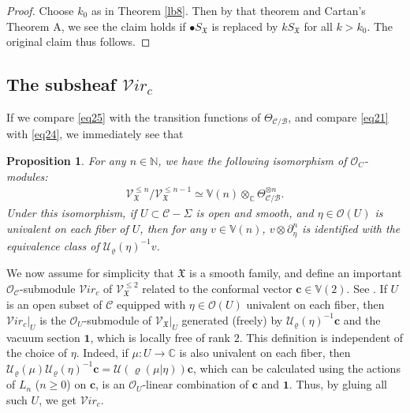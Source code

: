 \documentclass[12pt,a4paper,notitlepage]{article}
\theoremstyle{definition}
\theoremstyle{plain}
\newtheorem{pp}[df]{Proposition}
\newcommand{\fk}{\mathfrak}
\newcommand{\mc}{\mathcal}
\newcommand{\id}{\mathbf{1}}
\newcommand{\scr}{\mathscr}
\newcommand{\SX}{S_{\fk X}}
\newcommand{\blt}{\bullet}
\newcommand{\Vbb}{\mathbb V}
\newcommand{\Cbb}{\mathbb C}
\newcommand{\Nbb}{\mathbb N}
\newcommand{\cbf}{\mathbf c}
\newcommand{\svir}{\mathcal V\!\mathit{ir}}
\numberwithin{equation}{section}
\begin{document}
\begin{proof}
Choose $k_0$ as in Theorem \ref{lb8}. Then by that theorem  and Cartan's Theorem A, we see the claim holds if $\blt\SX$ is replaced by $k\SX$ for all $k>k_0$. The original claim thus follows.
\end{proof}







\subsection*{The subsheaf $\svir_c$}

If we compare \eqref{eq25} with the transition functions of $\Theta_{\mc C/\mc B}$, and  compare \eqref{eq21} with \eqref{eq24}, we immediately see that

\begin{pp}\label{lb12}
For any $n\in\Nbb$, we have the following isomorphism of  $\scr O_C$-modules:
	\begin{align}
	\scr V_{\fk X}^{\leq n}/\scr V_{\fk X}^{\leq n-1}\simeq\Vbb(n)\otimes_{\Cbb}\Theta_{\mc C/\mc B}^{\otimes n}.
	\end{align}
Under this isomorphism, if $U\subset \mc C-\Sigma$ is open and smooth, and $\eta\in\scr O(U)$ is univalent on each fiber of $U$, then for any $v\in\Vbb(n)$, $v\otimes \partial_\eta^n$ is identified with the equivalence class of $\mc U_\varrho(\eta)^{-1}v$.
\end{pp}

We now assume for simplicity that $\fk X$ is a smooth family, and define an important $\scr O_{\mc C}$-submodule $\svir_c$ \index{Virc@$\svir_c$} of $\scr V_{\fk X}^{\leq 2}$ related to the conformal vector $\cbf\in\Vbb(2)$. See \cite[Sec. 8.2]{FB04}. If $U$ is an open subset of $\mc C$ equipped with  $\eta\in\scr O(U)$ univalent on each fiber, then $\svir_c|_U$ is the  $\scr O_U$-submodule of $\scr V_{\fk X}|_U$ generated (freely) by $\mc U_\varrho(\eta)^{-1}\cbf$ and the vacuum section $\id$, which is locally free of rank $2$. This definition is independent of the choice of $\eta$. Indeed, if $\mu:U\rightarrow\Cbb$ is also univalent on each fiber, then $\mc U_\varrho(\mu)\mc U_\varrho(\eta)^{-1}\cbf=\mc U(\varrho(\mu|\eta))\cbf$, which can be calculated using the actions of $L_n$ ($n\geq 0$) on $\cbf$, is an $\scr O_U$-linear combination of $\cbf$ and $\id$. Thus, by gluing all such $U$, we get $\svir_c$.
\end{document}
